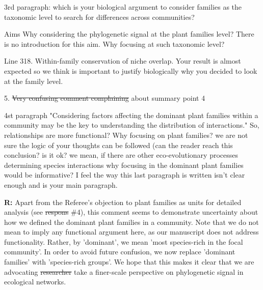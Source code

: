 \documentclass[12pt]{letter}
\newenvironment{refquote}{\bigskip \begin{it}}{\end{it}\smallskip}
\providecommand{\DIFadd}[1]{{\protect\color{blue}\uwave{#1}}} %
\providecommand{\DIFdel}[1]{{\protect\color{red}\sout{#1}}}                      %
\providecommand{\DIFaddbegin}{} %
\providecommand{\DIFaddend}{} %
\providecommand{\DIFdelbegin}{} %
\providecommand{\DIFdelend}{} %
\newcommand{\DIFscaledelfig}{0.5}
\newlength{\DIFdelgraphicswidth} %
\newlength{\DIFdelgraphicsheight} %
\newcommand{\DIFaddincludegraphics}[2][]{{\color{blue}\fbox{\DIFOincludegraphics[#1]{#2}}}} %
\newcommand{\DIFdelincludegraphics}[2][]{%
\sbox{\DIFdelgraphicsbox}{\DIFOincludegraphics[#1]{#2}}%
\settoboxwidth{\DIFdelgraphicswidth}{\DIFdelgraphicsbox} %
\settoboxtotalheight{\DIFdelgraphicsheight}{\DIFdelgraphicsbox} %
\scalebox{\DIFscaledelfig}{%
\parbox[b]{\DIFdelgraphicswidth}{\usebox{\DIFdelgraphicsbox}\\[-\baselineskip] \rule{\DIFdelgraphicswidth}{0em}}\llap{\resizebox{\DIFdelgraphicswidth}{\DIFdelgraphicsheight}{%
\setlength{\unitlength}{\DIFdelgraphicswidth}%
\begin{picture}(1,1)%
\thicklines\linethickness{2pt} %
{\color[rgb]{1,0,0}\put(0,0){\framebox(1,1){}}}%
{\color[rgb]{1,0,0}\put(0,0){\line( 1,1){1}}}%
{\color[rgb]{1,0,0}\put(0,1){\line(1,-1){1}}}%
\end{picture}%
}\hspace*{3pt}}} %
} %
\DeclareRobustCommand{\DIFaddbegin}{\DIFOaddbegin \let\includegraphics\DIFaddincludegraphics} %
\DeclareRobustCommand{\DIFaddend}{\DIFOaddend \let\includegraphics\DIFOincludegraphics} %
\DeclareRobustCommand{\DIFdelbegin}{\DIFOdelbegin \let\includegraphics\DIFdelincludegraphics} %
\DeclareRobustCommand{\DIFdelend}{\DIFOaddend \let\includegraphics\DIFOincludegraphics} %
\begin{document}
		\begin{refquote}
		3rd paragraph:  which is your biological argument to consider families as the taxonomic level to search for differences across communities?
		\end{refquote}


		\begin{refquote}
		Aims
		Why considering the phylogenetic signal at the plant families level? There is no introduction for this aim. Why focusing at such taxonomic level?
		\end{refquote}


		\begin{refquote}
			Line 318. Within-family conservation of niche overlap. Your result is almost expected so we think is important to justify biologically why you decided to look at the family level.
		\end{refquote}


	5. \DIFdelbegin \DIFdel{Very confusing comment complaining }\DIFdelend \DIFaddbegin \DIFadd{Comments }\DIFaddend about summary point 4

		\begin{refquote}
		4st paragraph "Considering factors affecting the dominant plant families within
		a community may be the key to understanding the distribution of interactions." So, relationships are more functional? Why focusing on plant families? we are not sure the logic of your thoughts can be followed (can the reader reach this conclusion? is it ok? we mean, if there are other eco-evolutionary processes determining species interactions why focusing in the dominant plant families would be informative? I feel the way this last paragraph is written isn't clear enough and is your main paragraph.
		\end{refquote}


		\textbf{R:} Apart from the Referee's objection to plant families as units for detailed analysis (see \DIFdelbegin \DIFdel{respons }\DIFdelend \DIFaddbegin \DIFadd{response }\DIFaddend \#4), this comment seems to demonstrate uncertainty about how we defined the dominant plant families in a community. Note that we do not mean to imply any functional argument here, as our manuscript does not address functionality. Rather, by 'dominant', we mean 'most species-rich in the focal community'. In order to avoid future confusion, we now replace 'dominant families' with 'species-rich groups'. We hope that this makes it clear that we are advocating \DIFdelbegin \DIFdel{researcher }\DIFdelend \DIFaddbegin \DIFadd{researchers }\DIFaddend take a finer-scale perspective on phylogenetic signal in ecological networks.
\end{document}
